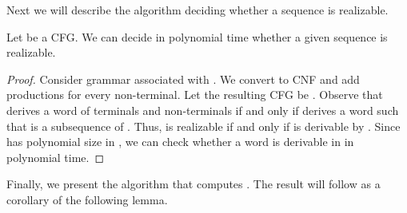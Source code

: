 \documentclass{CSML}
\begin{document}
Next we will describe the algorithm deciding whether a sequence is realizable.


\begin{lem}
Let  be a CFG.  
We can decide in polynomial time whether
a given sequence  is realizable.
\label{l:realizability-polynomial}
\end{lem}
\begin{proof}
Consider grammar  associated with . 
We convert  to CNF and add productions  for every non-terminal. 
Let the resulting CFG be .
Observe that  derives a word of terminals and non-terminals  if and only if 
 derives a word  such that  is a subsequence of . 
Thus,  is realizable if and only if 
 is derivable by . 
Since  has polynomial size in , we can check whether a word is derivable in  in polynomial time.
\end{proof}

Finally, we present the algorithm that computes . 
The result will follow as a corollary of the following lemma.
\end{document}
